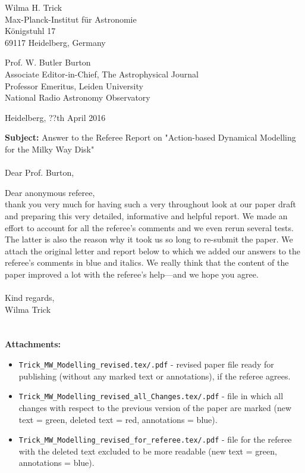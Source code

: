 \documentclass[10pt,a4paper]{article}
\begin{document}
\begin{flushright}
Wilma H. Trick\\
Max-Planck-Institut f\"{u}r Astronomie\\
K\"{o}nigstuhl 17\\
69117 Heidelberg, Germany
\end{flushright}

\noindent Prof. W. Butler Burton\\
Associate Editor-in-Chief, The Astrophysical Journal\\
Professor Emeritus, Leiden University\\
National Radio Astronomy Observatory\\

\begin{flushright}
Heidelberg, ??th April 2016
\end{flushright}

\textbf{Subject:} Answer to the Referee Report on "Action-based Dynamical Modelling for the Milky Way Disk"\\\\

Dear Prof. Burton,

Dear anonymous referee,\\

thank you very much for having such a very throughout look at our paper draft and preparing this very detailed, informative and helpful report. We made an effort to account for all the referee's comments and we even rerun several tests. The latter is also the reason why it took us so long to re-submit the paper. We attach the original letter and report below to which we added our answers to the referee's comments in blue and italics. We really think that the content of the paper improved a lot with the referee's help---and we hope you agree.\\\\
Kind regards,\\
Wilma Trick\\\\\\

\noindent\textbf{Attachments:}
\begin{itemize}
\item \texttt{Trick{\_}MW{\_}Modelling{\_}revised.tex/.pdf} - revised paper file ready for publishing (without any marked text or annotations), if the referee agrees.
\item \texttt{Trick{\_}MW{\_}Modelling{\_}revised{\_}all{\_}Changes.tex/.pdf} - file in which all changes with respect to the previous version of the paper are marked (new text = green, deleted text = red, annotations = blue).
\item \texttt{Trick{\_}MW{\_}Modelling{\_}revised{\_}for{\_}referee.tex/.pdf} - file for the referee with the deleted text excluded to be more readable (new text = green, annotations = blue).
\end{itemize}
\end{document}
